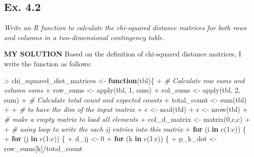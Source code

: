 \documentclass[
]{article}
\newenvironment{Shaded}{\begin{snugshade}}{\end{snugshade}}
\newcommand{\CommentTok}[1]{\textcolor[rgb]{0.56,0.35,0.01}{\textit{#1}}}
\newcommand{\ControlFlowTok}[1]{\textcolor[rgb]{0.13,0.29,0.53}{\textbf{#1}}}
\newcommand{\DecValTok}[1]{\textcolor[rgb]{0.00,0.00,0.81}{#1}}
\newcommand{\FunctionTok}[1]{\textcolor[rgb]{0.00,0.00,0.00}{#1}}
\newcommand{\NormalTok}[1]{#1}
\newcommand{\OtherTok}[1]{\textcolor[rgb]{0.56,0.35,0.01}{#1}}
\newcommand{\SpecialCharTok}[1]{\textcolor[rgb]{0.00,0.00,0.00}{#1}}
\begin{document}
\hypertarget{ex.-4.2}{%
\subsection{Ex. 4.2}\label{ex.-4.2}}

\emph{Write an R function to calculate the chi-squared distance matrices
for both rows and columns in a two-dimensional contingency table.}

\textbf{MY SOLUTION} Based on the definition of chi-squared distance
matrices, I write the function as follows:

\begin{Shaded}
\begin{Highlighting}[]
\SpecialCharTok{\textgreater{}}\NormalTok{ chi\_squared\_dist\_matrices }\OtherTok{\textless{}{-}} \ControlFlowTok{function}\NormalTok{(tbl)\{}
\SpecialCharTok{+}   \CommentTok{\# Calculate row sums and column sums}
\SpecialCharTok{+}\NormalTok{   row\_sums }\OtherTok{\textless{}{-}} \FunctionTok{apply}\NormalTok{(tbl, }\DecValTok{1}\NormalTok{, sum)}
\SpecialCharTok{+}\NormalTok{   col\_sums }\OtherTok{\textless{}{-}} \FunctionTok{apply}\NormalTok{(tbl, }\DecValTok{2}\NormalTok{, sum)}
\SpecialCharTok{+}   \CommentTok{\# Calculate total count and expected counts}
\SpecialCharTok{+}\NormalTok{   total\_count }\OtherTok{\textless{}{-}} \FunctionTok{sum}\NormalTok{(tbl)}
\SpecialCharTok{+}   
\SpecialCharTok{+}   \CommentTok{\# to have the dim of the input matrix}
\SpecialCharTok{+}\NormalTok{   c }\OtherTok{\textless{}{-}} \FunctionTok{ncol}\NormalTok{(tbl)}
\SpecialCharTok{+}\NormalTok{   r }\OtherTok{\textless{}{-}} \FunctionTok{nrow}\NormalTok{(tbl)}
\SpecialCharTok{+}   \CommentTok{\# make a empty matrix to load all elements}
\SpecialCharTok{+}\NormalTok{   col\_d\_matrix }\OtherTok{\textless{}{-}} \FunctionTok{matrix}\NormalTok{(}\DecValTok{0}\NormalTok{,c,c)}
\SpecialCharTok{+}   
\SpecialCharTok{+}   \CommentTok{\# using loop to write the each ij entries into this matrix}
\SpecialCharTok{+}   \ControlFlowTok{for}\NormalTok{ (i }\ControlFlowTok{in} \FunctionTok{c}\NormalTok{(}\DecValTok{1}\SpecialCharTok{:}\NormalTok{c)) \{}
\SpecialCharTok{+}     \ControlFlowTok{for}\NormalTok{ (j }\ControlFlowTok{in} \FunctionTok{c}\NormalTok{(}\DecValTok{1}\SpecialCharTok{:}\NormalTok{c)) \{}
\SpecialCharTok{+}\NormalTok{       d\_ij }\OtherTok{\textless{}{-}} \DecValTok{0}
\SpecialCharTok{+}       \ControlFlowTok{for}\NormalTok{ (k }\ControlFlowTok{in} \FunctionTok{c}\NormalTok{(}\DecValTok{1}\SpecialCharTok{:}\NormalTok{r)) \{}
\SpecialCharTok{+}\NormalTok{         p\_k\_dot }\OtherTok{\textless{}{-}}\NormalTok{ row\_sums[k]}\SpecialCharTok{/}\NormalTok{total\_count}

\end{Highlighting}
\end{Shaded}
\end{document}
